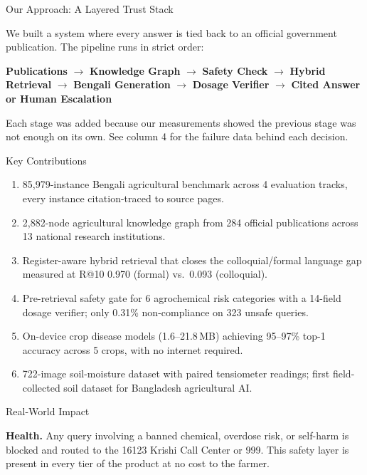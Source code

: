 \documentclass[final]{beamer}
\newlength{\colwidth}\setlength{\colwidth}{0.1796\paperwidth}
\newcommand{\Nbench}{85{,}979}
\newcommand{\Nnodes}{2{,}882}
\newcommand{\Npubs}{284}
\newcommand{\Ninst}{13}
\newcommand{\Rdensecolloq}{0.093}
\newcommand{\Rdenseformal}{0.970}
\newcommand{\Krishi}{16123}
\newcommand{\Emergency}{999}
\newcommand{\NonCompliance}{0.31\%}
\begin{document}
\begin{frame}[t]
\begin{columns}[t]
\begin{column}{\colwidth}
  \begin{block}{Our Approach: A Layered Trust Stack}
    {\small We built a system where every answer is tied back to an official government
    publication. The pipeline runs in strict order:

    \vspace{0.5ex}
    \textbf{Publications} $\rightarrow$ \textbf{Knowledge Graph} $\rightarrow$
    \textbf{Safety Check} $\rightarrow$ \textbf{Hybrid Retrieval} $\rightarrow$
    \textbf{Bengali Generation} $\rightarrow$ \textbf{Dosage Verifier}
    $\rightarrow$ \textbf{Cited Answer or Human Escalation}

    \vspace{0.3ex}
    Each stage was added because our measurements showed the previous stage was not enough
    on its own. See column 4 for the failure data behind each decision.}
  \end{block}

  \begin{block}{Key Contributions}
    {\small
    \begin{enumerate}\setlength{\itemsep}{0.3ex}
      \item \Nbench-instance Bengali agricultural benchmark across 4 evaluation tracks,
            every instance citation-traced to source pages.
      \item \Nnodes-node agricultural knowledge graph from \Npubs{} official publications
            across \Ninst{} national research institutions.
      \item Register-aware hybrid retrieval that closes the colloquial/formal language gap
            measured at R@10 \Rdenseformal{} (formal) vs.\ \Rdensecolloq{} (colloquial).
      \item Pre-retrieval safety gate for 6 agrochemical risk categories with a 14-field
            dosage verifier; only \NonCompliance{} non-compliance on 323 unsafe queries.
      \item On-device crop disease models (1.6--21.8\,MB) achieving 95--97\% top-1 accuracy
            across 5 crops, with no internet required.
      \item 722-image soil-moisture dataset with paired tensiometer readings; first
            field-collected soil dataset for Bangladesh agricultural AI.
    \end{enumerate}}
  \end{block}

  \begin{block}{Real-World Impact}
    {\small
    \textbf{Health.} Any query involving a banned chemical, overdose risk, or self-harm
    is blocked and routed to the \Krishi{} Krishi Call Center or \Emergency{}.
    This safety layer is present in every tier of the product at no cost to the farmer.

}
\end{block}
\end{column}
\end{columns}
\end{frame}
\end{document}
